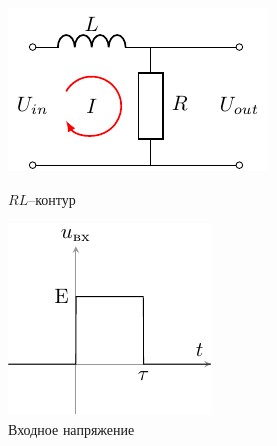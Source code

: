 \begin{figure}[h!]
\centering
\begin{minipage}{0.4\textwidth}
\centering
\includegraphics[width=\linewidth]{chem/task2}
\caption{$RL$--контур}
\label{fig:4figsA}
\end{minipage}
\qquad
\begin{minipage}{0.4\textwidth}
\centering
\includegraphics[width=\linewidth]{ris/task4_input}
\caption{Входное напряжение}
\label{fig:4figsB}
\end{minipage}
\end{figure}

